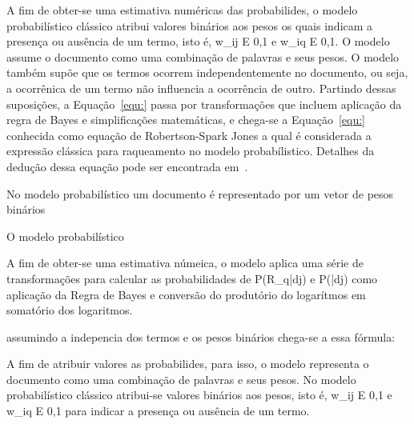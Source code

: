 








A fim de obter-se uma estimativa numéricas das probabilides, o modelo probabilístico clássico atribui valores binários aos pesos os quais indicam a presença ou ausência de um termo, isto é, w_ij E {0,1} e w_iq E {0,1}. 
O modelo assume o documento como uma combinação de palavras e seus pesos. 
O modelo também supõe que os termos ocorrem independentemente no documento, ou seja, a ocorrênica de um termo não influencia a ocorrência de outro. 
Partindo dessas suposições, a Equação~\ref{equ:} passa por transformações que incluem aplicação da regra de Bayes e simplificações matemáticas, e chega-se a Equação~\ref{equ:} conhecida como equação de Robertson-Spark Jones a qual é considerada a expressão clássica para raqueamento no modelo probabílistico. Detalhes da dedução dessa equação pode ser encontrada em~\cite{}.





No modelo probabilístico um documento é representado por um vetor de pesos binários 



O modelo probabilístico

A fim de obter-se uma estimativa númeica, o modelo aplica uma série de transformações para calcular as probabilidades de P(R_q|dj) e P(|dj) como 
aplicação da Regra de Bayes 
e conversão do produtório do logarítmos em somatório dos logaritmos.




assumindo a indepencia dos termos e os pesos binários chega-se a essa fórmula:



A fim de atribuir valores as probabilides, para isso, o modelo representa o documento como uma combinação de palavras e seus pesos. No modelo probabilístico clássico atribui-se valores binários aos pesos, isto é, w_ij E {0,1} e w_iq E {0,1} para indicar a presença ou ausência de um termo.















